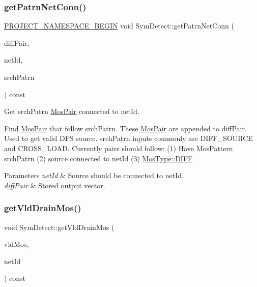 \subsubsection{\texorpdfstring{get\+Patrn\+Net\+Conn()}{getPatrnNetConn()}}
{\footnotesize\ttfamily \hyperlink{namespace_8h_ae48726a24dab2034454cf6d79e531eb8}{P\+R\+O\+J\+E\+C\+T\+\_\+\+N\+A\+M\+E\+S\+P\+A\+C\+E\+\_\+\+B\+E\+G\+IN} void Sym\+Detect\+::get\+Patrn\+Net\+Conn (\begin{DoxyParamCaption}\item[{std\+::vector$<$ \hyperlink{classMosPair}{Mos\+Pair} $>$ \&}]{diff\+Pair,  }\item[{\hyperlink{type_8h_a581e8093e28e7362f2b6937296190676}{Index\+Type}}]{net\+Id,  }\item[{\hyperlink{type_8h_af19eddb079bfea723256710b029c38e8}{Mos\+Pattern}}]{srch\+Patrn }\end{DoxyParamCaption}) const\hspace{0.3cm}{\ttfamily [private]}}



Get srch\+Patrn \hyperlink{classMosPair}{Mos\+Pair} connected to net\+Id. 

Find \hyperlink{classMosPair}{Mos\+Pair} that follow srch\+Patrn. These \hyperlink{classMosPair}{Mos\+Pair} are appended to diff\+Pair. Used to get valid D\+FS source. srch\+Patrn inputs commonly are D\+I\+F\+F\+\_\+\+S\+O\+U\+R\+CE and C\+R\+O\+S\+S\+\_\+\+L\+O\+AD. Currently pairs should follow\+: (1) Have Mos\+Pattern srch\+Patrn (2) source connected to net\+Id (3) \hyperlink{type_8h_a34a6a66323cfecf83dfe00bc8fd96333aa2e1ec2dd3d8195d238c5494f0ac5578}{Mos\+Type\+::\+D\+I\+FF}


\begin{DoxyParams}{Parameters}
{\em net\+Id} & Source should be connected to net\+Id. \\
\hline
{\em diff\+Pair} & Stored output vector. \\
\hline
\end{DoxyParams}
\mbox{\label{classSymDetect_a48c23173bf5e56c3aa11ac306715cba2}} 
\subsubsection{\texorpdfstring{get\+Vld\+Drain\+Mos()}{getVldDrainMos()}}
{\footnotesize\ttfamily void Sym\+Detect\+::get\+Vld\+Drain\+Mos (\begin{DoxyParamCaption}\item[{std\+::vector$<$ \hyperlink{type_8h_a581e8093e28e7362f2b6937296190676}{Index\+Type} $>$ \&}]{vld\+Mos,  }\item[{\hyperlink{type_8h_a581e8093e28e7362f2b6937296190676}{Index\+Type}}]{net\+Id }\end{DoxyParamCaption}) const\hspace{0.3cm}{\ttfamily [private]}}



